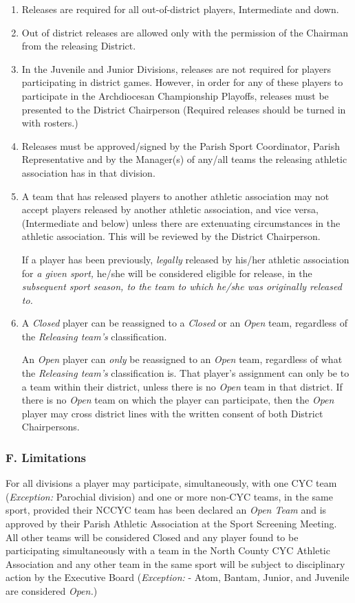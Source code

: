 \begin{enumerate}[1.]
    \item Releases are required for all out-of-district players, Intermediate and down.
    \item Out of district releases are allowed only with the permission of the Chairman from the releasing District.
    \item In the Juvenile and Junior Divisions, releases are not required for players participating in district games.  However, in order for any of these players to participate in the Archdiocesan Championship Playoffs, releases must be presented to the District Chairperson (Required releases should be turned in with rosters.)
    \item Releases must be approved/signed by the Parish Sport Coordi­nator, Parish Representative and by the Manager(s) of any/all teams the releasing athletic association has in that division.
    \item A team that has released players to another athletic association may not accept players re­leased by another athletic association, and vice versa, (Intermediate and below) unless there are extenuating circumstances in the athletic association. This will be reviewed by the District Chairperson.
    
    If a player has been previously, {\em legally} released by his/her athletic association for {\em a given sport,} he/she will be considered eligible for release, in the {\em subsequent sport season, to the team to which he/she was originally released to.}

    \item A {\em Closed} player can be reassigned to a {\em Closed} or an {\em Open} team, regardless of the {\em Releasing team’s} classification.
    
    An {\em Open} player can {\em only} be reassigned to an {\em Open} team, regardless of what the {\em Releasing team’s} classification is. That player’s assignment can only be to a team within their district, unless there is no {\em Open} team in that district.  If there is no {\em Open} team on which the player can participate, then the {\em Open} player may cross district lines with the written consent of both District Chairpersons.
\end{enumerate}

\subsubsection{F. Limitations}
For all divisions a player may participate, simultaneously, with one CYC team ({\em Exception:} Parochial division) and one or more non-CYC teams, in the same sport, provided their NCCYC team has been declared an {\em Open Team} and is approved by their Parish Athletic Association at the Sport Screening Meeting.  All other teams will be considered Closed and any player found to be participating simultaneously with a team in the North County CYC Athletic Association and any other team in the same sport will be subject to disciplinary action by the Executive Board ({\em Exception:} - Atom, Bantam, Junior, and Juvenile are considered {\em Open.})


